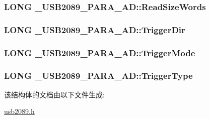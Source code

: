 \subsubsection[{\texorpdfstring{Read\+Size\+Words}{ReadSizeWords}}]{\setlength{\rightskip}{0pt plus 5cm}L\+O\+NG \+\_\+\+U\+S\+B2089\+\_\+\+P\+A\+R\+A\+\_\+\+A\+D\+::\+Read\+Size\+Words}\hypertarget{struct___u_s_b2089___p_a_r_a___a_d_ad337e2c8a8ab80adf0721f273af39b5b}{}\label{struct___u_s_b2089___p_a_r_a___a_d_ad337e2c8a8ab80adf0721f273af39b5b}
\subsubsection[{\texorpdfstring{Trigger\+Dir}{TriggerDir}}]{\setlength{\rightskip}{0pt plus 5cm}L\+O\+NG \+\_\+\+U\+S\+B2089\+\_\+\+P\+A\+R\+A\+\_\+\+A\+D\+::\+Trigger\+Dir}\hypertarget{struct___u_s_b2089___p_a_r_a___a_d_a7e2a33fc23abe47b91154e556e85c991}{}\label{struct___u_s_b2089___p_a_r_a___a_d_a7e2a33fc23abe47b91154e556e85c991}
\subsubsection[{\texorpdfstring{Trigger\+Mode}{TriggerMode}}]{\setlength{\rightskip}{0pt plus 5cm}L\+O\+NG \+\_\+\+U\+S\+B2089\+\_\+\+P\+A\+R\+A\+\_\+\+A\+D\+::\+Trigger\+Mode}\hypertarget{struct___u_s_b2089___p_a_r_a___a_d_a21784127891ec6b61e1c540eeeebbdf8}{}\label{struct___u_s_b2089___p_a_r_a___a_d_a21784127891ec6b61e1c540eeeebbdf8}
\subsubsection[{\texorpdfstring{Trigger\+Type}{TriggerType}}]{\setlength{\rightskip}{0pt plus 5cm}L\+O\+NG \+\_\+\+U\+S\+B2089\+\_\+\+P\+A\+R\+A\+\_\+\+A\+D\+::\+Trigger\+Type}\hypertarget{struct___u_s_b2089___p_a_r_a___a_d_a40a568ec452439655638e36c8b11c438}{}\label{struct___u_s_b2089___p_a_r_a___a_d_a40a568ec452439655638e36c8b11c438}


该结构体的文档由以下文件生成\+:\begin{DoxyCompactItemize}
\item 
\hyperlink{usb2089_8h}{usb2089.\+h}\end{DoxyCompactItemize}
